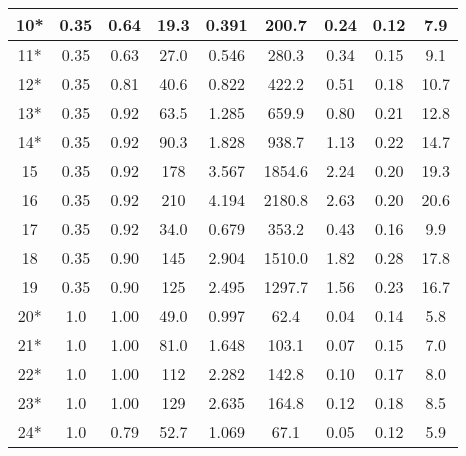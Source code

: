 \begin{table}[!ht]
\begin{center}
\begin{tabular}{|c|c|c|c|c|c|c||c|c|}
10*       & 0.35     & 0.64       & 19.3        &  0.391                &  200.7         & 0.24          & 0.12       & 7.9      \\ \hline
11*       & 0.35     & 0.63       & 27.0        &  0.546                &  280.3         & 0.34          & 0.15       & 9.1      \\ \hline
12*       & 0.35     & 0.81       & 40.6        &  0.822                &  422.2         & 0.51          & 0.18       & 10.7      \\ \hline
13*       & 0.35     & 0.92       & 63.5        &  1.285                &  659.9         & 0.80          & 0.21       & 12.8       \\ \hline
14*       & 0.35     & 0.92       & 90.3        &  1.828                &  938.7         & 1.13          & 0.22       & 14.7       \\ \hline
15        & 0.35     & 0.92       & 178         &  3.567                &  1854.6        & 2.24          & 0.20       & 19.3       \\ \hline
16        & 0.35     & 0.92       & 210         &  4.194                &  2180.8        & 2.63          & 0.20       & 20.6       \\ \hline
17        & 0.35     & 0.92       & 34.0        &  0.679                &  353.2         & 0.43          & 0.16       & 9.9      \\ \hline
18        & 0.35     & 0.90       & 145         &  2.904                &  1510.0        & 1.82          & 0.28       & 17.8       \\ \hline
19        & 0.35     & 0.90       & 125         &  2.495                &  1297.7        & 1.56          & 0.23       & 16.7       \\ \hline
20*       & 1.0      & 1.00       & 49.0        &  0.997                &  62.4          & 0.04          & 0.14       & 5.8      \\ \hline
21*       & 1.0      & 1.00       & 81.0        &  1.648                &  103.1         & 0.07          & 0.15       & 7.0      \\ \hline
22*       & 1.0      & 1.00       & 112         &  2.282                &  142.8         & 0.10          & 0.17       & 8.0       \\ \hline
23*       & 1.0      & 1.00       & 129         &  2.635                &  164.8         & 0.12          & 0.18       & 8.5       \\ \hline
24*       & 1.0      & 0.79       & 52.7        &  1.069                &  67.1          & 0.05          & 0.12       & 5.9      \\ \hline

\end{tabular}
\end{center}
\end{table}
